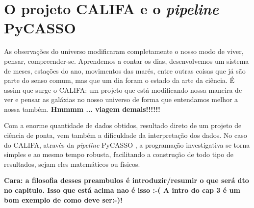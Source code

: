 


\chapter{O projeto CALIFA e o {\em pipeline} PyCASSO}
\label{sec:CALePyC}

As observações do universo modificaram completamente o nosso modo de viver, pensar, compreender-se. Aprendemos a contar
os dias, desenvolvemos um sistema de meses, estações do ano, movimentos das marés, entre outras coisas que já são parte
do senso comum, mas que um dia foram o estado da arte da ciência. É assim que surge o CALIFA: um projeto que está
modificando nossa maneira de ver e pensar as galáxias no nosso universo de forma que entendamos melhor a nossa também.
{\bf\ojo Hmmmm ... viagem demais!!!!!!}

Com a enorme quantidade de dados obtidos, resultado direto de um projeto de ciência de ponta, vem também a dificuldade
da interpretação dos dados. No caso do CALIFA, através da {\em pipeline} PyCASSO \citep{CidFernandes2013I}, a
programação investigativa se torna simples e ao mesmo tempo robusta, facilitando a construção de todo tipo de
resultados, sejam eles \ojo matemáticos ou físicos.

{\bf \ojo Cara: a filosofia desses preambulos é introduzir/resumir o que será dto no capitulo. Isso que está acima nao é isso :-( A intro do cap 3 é um bom exemplo de como deve ser:-)!
}


